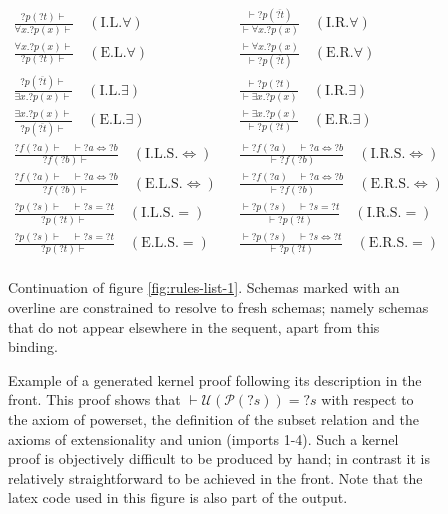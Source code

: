 \begin{figure}[hbt!]
  \begingroup
  \allowdisplaybreaks
  \begin{align*}
  \frac{{?p}({?t}) \vdash}{\forall x. {?p}(x) \vdash} \quad (\text{I.L.} \forall) && \frac{\vdash {?p}(\overline{?t})}{\vdash \forall x. {?p}(x)} \quad (\text{I.R.} \forall) \\[1em]
  \frac{\forall x. {?p}(x) \vdash}{{?p}({?t}) \vdash} \quad (\text{E.L.} \forall) && \frac{\vdash \forall x. {?p}(x)}{\vdash {?p}(\overline{?t})} \quad (\text{E.R.} \forall) \\[1em]
  \frac{{?p}(\overline{?t}) \vdash}{\exists x. {?p}(x) \vdash} \quad (\text{I.L.} \exists) && \frac{\vdash {?p}({?t})}{\vdash \exists x. {?p}(x)} \quad (\text{I.R.} \exists) \\[1em]
  \frac{\exists x. {?p}(x) \vdash}{{?p}(\overline{?t}) \vdash} \quad (\text{E.L.} \exists) && \frac{\vdash \exists x. {?p}(x)}{\vdash {?p}({?t})} \quad (\text{E.R.} \exists) \\[1em]
  \frac{{?f}({?a}) \vdash \quad \vdash {?a} \Leftrightarrow {?b}}{{?f}({?b}) \vdash} \quad (\text{I.L.S.} \Leftrightarrow) && \frac{\vdash {?f}({?a}) \quad \vdash {?a} \Leftrightarrow {?b}}{\vdash {?f}({?b})} \quad (\text{I.R.S.} \Leftrightarrow) \\[1em]
  \frac{{?f}({?a}) \vdash \quad \vdash {?a} \Leftrightarrow {?b}}{{?f}({?b}) \vdash} \quad (\text{E.L.S.} \Leftrightarrow) && \frac{\vdash {?f}({?a}) \quad \vdash {?a} \Leftrightarrow {?b}}{\vdash {?f}({?b})} \quad (\text{E.R.S.} \Leftrightarrow) \\[1em]
  \frac{{?p}({?s}) \vdash \quad \vdash {?s} = {?t}}{{?p}({?t}) \vdash} \quad (\text{I.L.S.} =) && \frac{\vdash {?p}({?s}) \quad \vdash {?s} = {?t}}{\vdash {?p}({?t})} \quad (\text{I.R.S.} =) \\[1em]
  \frac{{?p}({?s}) \vdash \quad \vdash {?s} = {?t}}{{?p}({?t}) \vdash} \quad (\text{E.L.S.} =) && \frac{\vdash {?p}({?s}) \quad \vdash {?s} \Leftrightarrow {?t}}{\vdash {?p}({?t})} \quad (\text{E.R.S.} =) \\[1em]
  \end{align*}
  \endgroup
  \caption[Rules, continued]{Continuation of figure \ref{fig:rules-list-1}. Schemas marked with an overline are constrained to resolve to fresh schemas; namely schemas that do not appear elsewhere in the sequent, apart from this binding.}
  \label{fig:rules-list-2}
\end{figure}

\begin{figure}[hbt!]
  \centering
  
  \caption[Sample proof]{Example of a generated kernel proof following its description in the front. This proof shows that $\vdash \mathcal{U}(\mathcal{P}({?s})) = {?s}$ with respect to the axiom of powerset, the definition of the subset relation and the axioms of extensionality and union (imports 1-4). Such a kernel proof is objectively difficult to be produced by hand; in contrast it is relatively straightforward to be achieved in the front. Note that the latex code used in this figure is also part of the output.}
  \label{fig:lisa-proof-sample}
\end{figure}
